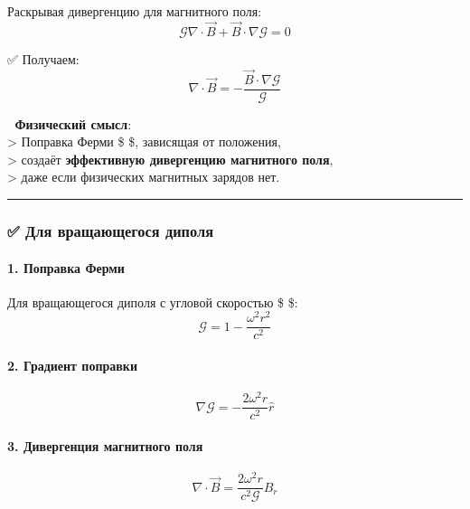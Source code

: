 \documentclass[11pt]{article}
\begin{document}
Раскрывая дивергенцию для магнитного поля: \[
\mathcal{G} \nabla \cdot \vec{B} + \vec{B} \cdot \nabla \mathcal{G} = 0
\]

✅ Получаем: \[
\boxed{
\nabla \cdot \vec{B} = -\frac{\vec{B} \cdot \nabla \mathcal{G}}{\mathcal{G}}
}
\]

📌 \textbf{Физический смысл}:\\
\textgreater{} Поправка Ферми \$  \$, зависящая от
положения,\\
\textgreater{} создаёт \textbf{эффективную дивергенцию магнитного
поля},\\
\textgreater{} даже если физических магнитных зарядов нет.

\begin{center}\rule{0.5\linewidth}{\linethickness}\end{center}

\subsubsection{✅ Для вращающегося
диполя}\label{ux434ux43bux44f-ux432ux440ux430ux449ux430ux44eux449ux435ux433ux43eux441ux44f-ux434ux438ux43fux43eux43bux44f}

\paragraph{1. Поправка
Ферми}\label{ux43fux43eux43fux440ux430ux432ux43aux430-ux444ux435ux440ux43cux438-1}

Для вращающегося диполя с угловой скоростью \$ \omega \$: \[
\mathcal{G} = 1 - \frac{\omega^2 r^2}{c^2}
\]

\paragraph{2. Градиент
поправки}\label{ux433ux440ux430ux434ux438ux435ux43dux442-ux43fux43eux43fux440ux430ux432ux43aux438}

\[
\nabla \mathcal{G} = -\frac{2\omega^2 r}{c^2} \hat{r}
\]

\paragraph{3. Дивергенция магнитного
поля}\label{ux434ux438ux432ux435ux440ux433ux435ux43dux446ux438ux44f-ux43cux430ux433ux43dux438ux442ux43dux43eux433ux43e-ux43fux43eux43bux44f}

\[
\nabla \cdot \vec{B} = \frac{2\omega^2 r}{c^2 \mathcal{G}} B_r
\]
\end{document}
